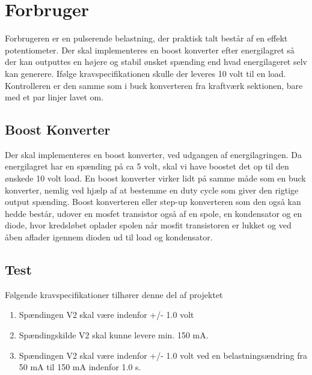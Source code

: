 \documentclass[../main.tex]{subfiles}
\begin{document}
\chapter{Forbruger} \label{Chap:Forbruger}
Forbrugeren er en pulserende belastning, der praktisk talt består af en effekt potentiometer. Der skal implementeres en boost konverter efter energilagret så der kan outputtes en højere og stabil ønsket spænding end hvad energilageret selv kan generere. Ifølge kravspecifikationen skulle der leveres 10 volt til en load. Kontrolleren er den samme som i buck konverteren fra kraftværk sektionen, bare med et par linjer lavet om. 

\section{Boost Konverter}
Der skal implementeres en boost konverter, ved udgangen af energilagringen. Da energilagret har en spænding på ca 5 volt, skal vi have boostet det op til den ønskede 10 volt load. En boost konverter virker lidt på samme måde som en buck konverter, nemlig ved hjælp af at bestemme en duty cycle som giver den rigtige output spænding. Boost konverteren eller step-up konverteren som den også kan hedde består, udover en mosfet transistor også af en spole, en kondensator og en diode, hvor kredsløbet oplader spolen når mosfit transistoren er lukket og ved åben aflader igennem dioden ud til load og kondensator. 

\section{Test}
Følgende kravspecifikationer tilhører denne del af projektet
\begin{enumerate}
  \item Spændingen V2 skal være indenfor +/- 1.0 volt
  \item Spændingskilde V2 skal kunne levere min. 150 mA.
  \item Spændingen V2 skal være indenfor +/- 1.0 volt ved en belastningsændring fra 50 mA til 150 mA indenfor 1.0 s.
\end{enumerate}
\end{document}
